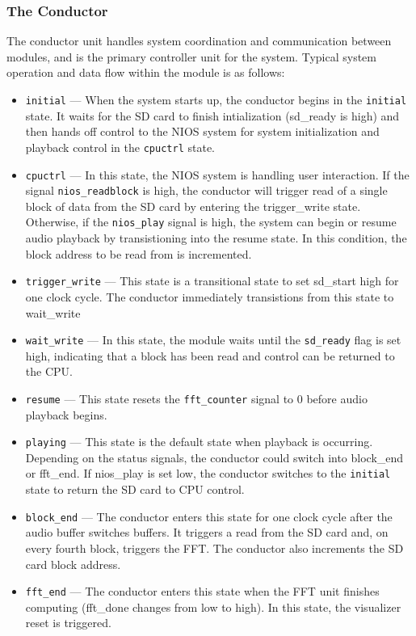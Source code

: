 \documentclass{article}
\begin{document}
\subsubsection{The Conductor}
The conductor unit handles system coordination and communication between modules, and is the primary controller unit for the system. Typical system operation and data flow within the module is as follows:
\begin{itemize}
	\item \texttt{initial} --- When the system starts up, the conductor begins 
		in the \texttt{initial} state. It waits for the SD card to finish 
		intialization (sd\_ready is high) and then hands off control to the NIOS 
		system for system initialization and playback control in the 
		\texttt{cpuctrl} state.
	\item \texttt{cpuctrl} --- In this state, the NIOS system is handling user 
		interaction. If the signal \texttt{nios\_readblock} is high, the 
		conductor will trigger read of a single block of data from the SD card
		by entering the trigger\_write state. Otherwise, if the \texttt{nios\_play} 
		signal is high, the system can begin or resume audio playback by 
		transistioning into the resume state. In this condition, the block 
		address to be read from is incremented.
	\item \texttt{trigger\_write} --- This state is a transitional state to set
		sd\_start high for one clock cycle. The conductor immediately 
		transistions from this state to wait\_write
	\item \texttt{wait\_write} --- In this state, the module waits until the 
		\texttt{sd\_ready} flag is set high, indicating that a block has been 
		read and control can be returned to the CPU.
	\item \texttt{resume} --- This state resets the \texttt{fft\_counter} 
		signal to 0 before audio playback begins.
	\item \texttt{playing} --- This state is the default state when playback
		is occurring. Depending on the status signals, the conductor could
		switch into block\_end or fft\_end. If nios\_play is set low, the
		conductor switches to the \texttt{initial} state to return the SD card 
		to CPU control.
	\item \texttt{block\_end} --- The conductor enters this state for one
		clock cycle after the audio buffer switches buffers. It triggers a 
		read from the SD card and, on every fourth block, triggers the FFT.
		The conductor also increments the SD card block address.
	\item \texttt{fft\_end} --- The conductor enters this state when the FFT
		unit finishes computing (fft\_done changes from low to high). In this
		state, the visualizer reset is triggered.
\end{itemize}
\end{document}
